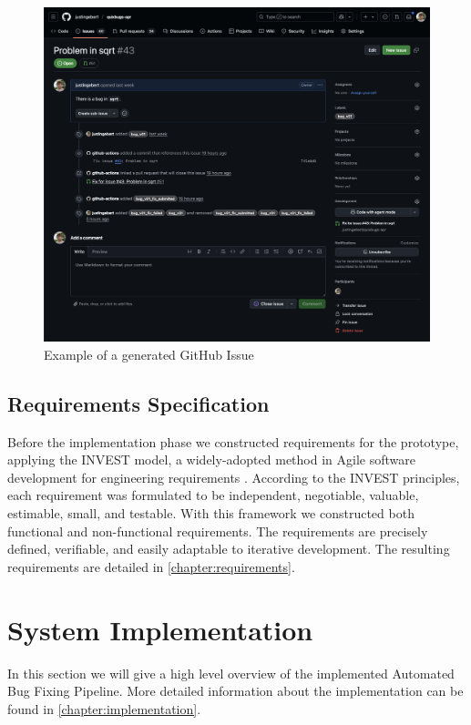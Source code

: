 \begin{figure}[H]
    \centering
    \includegraphics[width=1\textwidth]{images/github/github_issue.png}
    \caption{Example of a generated GitHub Issue}
    \label{fig:gh-issue2}
\end{figure}

\subsection{Requirements Specification}

Before the implementation phase we constructed requirements for the prototype, applying the INVEST model, a widely-adopted method in Agile software development for engineering requirements \cite{10.5555/984017}. According to the INVEST principles, each requirement was formulated to be independent, negotiable, valuable, estimable, small, and testable. With this framework we constructed both functional and non-functional requirements. The requirements are precisely defined, verifiable, and easily adaptable to iterative development. The resulting requirements are detailed in \ref{chapter:requirements}.

\section{System Implementation}

In this section we will give a high level overview of the implemented Automated Bug Fixing Pipeline. More detailed information about the implementation can be found in \ref{chapter:implementation}.


